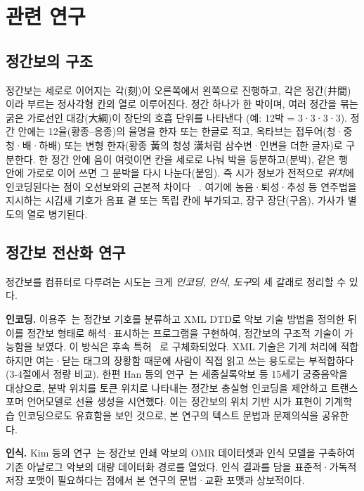 \section{관련 연구}
\label{sec:related}

\subsection{정간보의 구조}

정간보는 세로로 이어지는 각(刻)이 오른쪽에서 왼쪽으로 진행하고, 각은
정간(井間)이라 부르는 정사각형 칸의 열로 이루어진다. 정간 하나가 한 박이며,
여러 정간을 묶는 굵은 가로선인 대강(大綱)이 장단의 호흡 단위를 나타낸다
(예: 12박 = 3·3·3·3). 정간 안에는 12율(황종--응종)의 율명을 한자 또는
한글로 적고, 옥타브는 접두어(청·중청·배·하배) 또는 변형 한자(황종 黃의
청성 潢처럼 삼수변·인변을 더한 글자)로 구분한다. 한 정간 안에 음이 여럿이면 칸을 세로로 나눠 박을 등분하고(분박),
같은 행 안에 가로로 이어 쓰면 그 분박을 다시 나눈다(붙임). 즉 시가 정보가
전적으로 \emph{위치}에 인코딩된다는 점이 오선보와의 근본적 차이다
~\cite{kwon2000notation,kim2025omr}. 여기에 농음·퇴성·추성 등 연주법을
지시하는 시김새 기호가 음표 곁 또는 독립 칸에 부가되고, 장구 장단(구음),
가사가 별도의 열로 병기된다.

\subsection{정간보 전산화 연구}

정간보를 컴퓨터로 다루려는 시도는 크게 \emph{인코딩},
\emph{인식}, \emph{도구}의 세 갈래로 정리할 수 있다.

\textbf{인코딩.}
이용주~\cite{lee2013xml}는 정간보 기호를 분류하고 XML DTD로 악보 기술
방법을 정의한 뒤 이를 정간보 형태로 해석·표시하는 프로그램을 구현하여,
정간보의 구조적 기술이 가능함을 보였다. 이 방식은 후속 특허
~\cite{patent2017jgb}로 구체화되었다. XML 기술은 기계 처리에 적합하지만
여는·닫는 태그의 장황함 때문에 사람이 직접 읽고 쓰는 용도로는 부적합하다
(3-4절에서 정량 비교). 한편 Han 등의 연구~\cite{han2024sixdragons}는
세종실록악보
등 15세기 궁중음악을 대상으로, 분박 위치를 토큰 위치로 나타내는 정간보
충실형 인코딩을 제안하고 트랜스포머 언어모델로 선율 생성을 시연했다.
이는 정간보의 위치 기반 시가 표현이 기계학습 인코딩으로도 유효함을
보인 것으로, 본 연구의 텍스트 문법과 문제의식을 공유한다.

\textbf{인식.}
Kim 등의 연구~\cite{kim2025omr}는 정간보 인쇄 악보의 OMR 데이터셋과
인식 모델을 구축하여 기존 아날로그 악보의 대량 데이터화 경로를 열었다.
인식 결과를 담을 표준적·가독적 저장 포맷이 필요하다는 점에서
본 연구의 문법·교환 포맷과 상보적이다.

